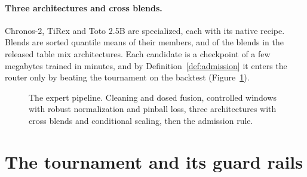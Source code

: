 \documentclass[11pt]{article}
\begin{document}
\paragraph{Three architectures and cross blends.} Chronos-2, TiRex and
Toto 2.5B are specialized, each with its native recipe.
Blends are sorted quantile means of their members, and \nBlendMixed{} of
the \nBlendAll{} blends in the released table mix architectures. Each candidate is a checkpoint of a few megabytes trained
in minutes, and by Definition~\ref{def:admission} it enters the router
only by beating the tournament on the backtest
(Figure~\ref{fig:pipeline}).

\begin{figure}[t]
\centering
{}
\caption{The expert pipeline. Cleaning and dosed fusion, controlled windows
with robust normalization and pinball loss, three architectures with cross
blends and conditional scaling, then the admission rule.}
\label{fig:pipeline}
\end{figure}

\section{The tournament and its guard rails}
\label{sec:tournament}
\end{document}
